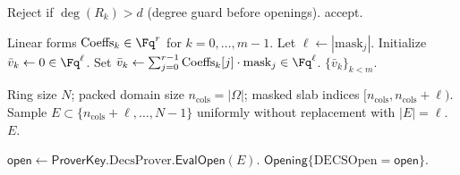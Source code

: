 \begin{algorithm}[H]
\caption{\textsf{LVCS.CommitStep2}(\(\{R_k\}_{k<\eta}\)) \(\to\) accept/reject (verifier)}
\label{alg:lvcs-commitstep2}
\begin{algorithmic}[1]
  \State Reject if \(\deg(R_k) > d\) (degree guard before openings).
\EndFor
\State \Return accept.
\end{algorithmic}
\end{algorithm}

\begin{algorithm}[H]
\caption{\textsf{LVCS.EvalInitMany}(\(\mathrm{ringQ},\mathsf{ProverKey},\{\mathrm{Coeffs}_k\}_{k<m}\)) \(\to \{\bar v_k\}_{k<m}\) (prover)}
\label{alg:lvcs-evalinit}
\begin{algorithmic}[1]
\Require Linear forms \(\mathrm{Coeffs}_k\in\Fq^{r}\) for \(k=0,\dots,m-1\).
\State Let \(\ell\gets |\mathrm{mask}_j|\).
  \State Initialize \(\bar v_k\gets 0\in\Fq^{\ell}\).
  \State Set \(\bar v_k \gets \sum_{j=0}^{r-1} \mathrm{Coeffs}_k[j]\cdot \mathrm{mask}_j \in \Fq^{\ell}\).
\EndFor
\State \Return \(\{\bar v_k\}_{k<m}\).
\end{algorithmic}
\end{algorithm}

\begin{algorithm}[H]
\caption{\textsf{LVCS.ChooseE}(\(\ell,n_{\mathrm{cols}}\)) \(\to E\) (verifier)}
\label{alg:lvcs-choosee}
\begin{algorithmic}[1]
\Require Ring size \(N\); packed domain size \(n_{\mathrm{cols}}=|\Omega|\); masked slab indices \([n_{\mathrm{cols}},n_{\mathrm{cols}}+\ell)\).
\State Sample \(E\subset \{n_{\mathrm{cols}}+\ell,\dots,N-1\}\) uniformly without replacement with \(|E|=\ell\).
\State \Return \(E\).
\end{algorithmic}
\end{algorithm}

\begin{algorithm}[H]
\caption{\textsf{LVCS.EvalFinish}(\(\mathsf{ProverKey},E\)) \(\to \mathsf{Opening}\) (prover)}
\label{alg:lvcs-evalfinish}
\begin{algorithmic}[1]
\State \(\mathsf{open}\gets \mathsf{ProverKey}.\mathrm{DecsProver}.\textsf{EvalOpen}(E)\).
\State \Return \(\mathsf{Opening}\{\mathrm{DECSOpen}=\mathsf{open}\}\).
\end{algorithmic}
\end{algorithm}

